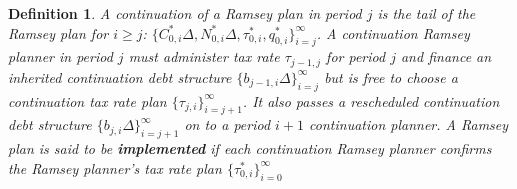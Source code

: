 \documentclass[12pt]{article}
\newtheorem{definition}{Definition}
\newcommand{\NW}[1]{{\textcolor{blue}{#1}}}
\begin{document}

\begin{definition} \label{defprotocol}
A continuation of a Ramsey plan in period $j$ is the {tail  
	of the Ramsey plan for $i \geq j$:  $\{C_{0, i}^\ast\Delta, N_{0, i}^\ast\Delta, \tau_{0, i}^\ast, q_{0, i}^\ast\}_{i= j}^\infty$}.
A continuation Ramsey planner in period $j$ must  administer tax rate $\tau_{j-1, j}$ for period $j$ and finance an inherited continuation {debt  structure}  $\{ b_{{j-1}, i}\Delta \}_{i=j}^\infty$  but is free to  choose a   continuation tax rate  plan    $\{\tau_{j, i}\}_{i=j+1}^\infty$. %
It also passes   a  rescheduled continuation  {debt  structure} $\{ b_{j, i}\Delta \}_{i=j+1}^\infty$ on   to a  period ${i+1}$ continuation planner.
A Ramsey plan  is said to be \textbf{implemented} if each continuation Ramsey planner confirms the  Ramsey planner's tax rate plan {$\{\tau_{0,i}^\ast\}_{i=0}^\infty$}
\end{definition}
\end{document}
